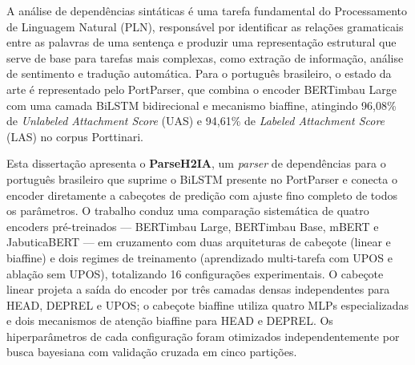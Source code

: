 
%
%

A análise de dependências sintáticas é uma tarefa fundamental do Processamento de Linguagem
Natural (PLN), responsável por identificar as relações gramaticais entre as palavras de uma
sentença e produzir uma representação estrutural que serve de base para tarefas mais complexas,
como extração de informação, análise de sentimento e tradução automática. Para o português
brasileiro, o estado da arte é representado pelo PortParser, que combina o encoder BERTimbau
Large com uma camada BiLSTM bidirecional e mecanismo biaffine, atingindo 96,08\% de
\textit{Unlabeled Attachment Score} (UAS) e 94,61\% de \textit{Labeled Attachment Score}
(LAS) no corpus Porttinari.

Esta dissertação apresenta o \textbf{ParseH2IA}, um \textit{parser} de dependências para o
português brasileiro que suprime o BiLSTM presente no PortParser e conecta o encoder
diretamente a cabeçotes de predição com ajuste fino completo de todos os parâmetros.
O trabalho conduz uma comparação sistemática de quatro encoders pré-treinados — BERTimbau
Large, BERTimbau Base, mBERT e JabuticaBERT — em cruzamento com duas arquiteturas de
cabeçote (linear e biaffine) e dois regimes de treinamento (aprendizado multi-tarefa com UPOS
e ablação sem UPOS), totalizando 16 configurações experimentais. O cabeçote linear projeta
a saída do encoder por três camadas densas independentes para HEAD, DEPREL e UPOS; o cabeçote
biaffine utiliza quatro MLPs especializadas e dois mecanismos de atenção biaffine para HEAD
e DEPREL. Os hiperparâmetros de cada configuração foram otimizados independentemente por
busca bayesiana com validação cruzada em cinco partições.

